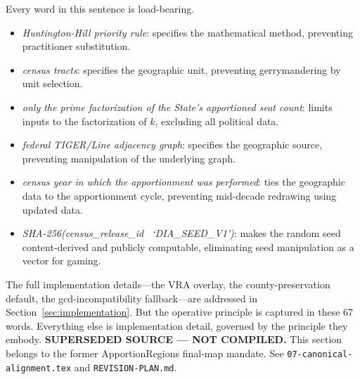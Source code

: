 Every word in this sentence is load-bearing.

\begin{itemize}
  \item \textit{Huntington-Hill priority rule}: specifies the mathematical
    method, preventing practitioner substitution.
  \item \textit{census tracts}: specifies the geographic unit, preventing
    gerrymandering by unit selection.
  \item \textit{only the prime factorization of the State's apportioned
    seat count}: limits inputs to the factorization of $k$, excluding
    all political data.
  \item \textit{federal TIGER/Line adjacency graph}: specifies the
    geographic source, preventing manipulation of the underlying graph.
  \item \textit{census year in which the apportionment was performed}:
    ties the geographic data to the apportionment cycle, preventing
    mid-decade redrawing using updated data.
  \item \textit{SHA-256(census\_release\_id \textbar\textbar\
    `DIA\_SEED\_V1')}: makes the random seed content-derived and publicly
    computable, eliminating seed manipulation as a vector for gaming.
\end{itemize}

The full implementation details---the VRA overlay, the county-preservation
default, the gcd-incompatibility fallback---are addressed in
Section~\ref{sec:implementation}.
But the operative principle is captured in these 67 words.
Everything else is implementation detail, governed by the principle they embody.
\noindent\textbf{SUPERSEDED SOURCE --- NOT COMPILED.} This section belongs to
the former ApportionRegions final-map mandate. See
\texttt{07-canonical-alignment.tex} and \texttt{REVISION-PLAN.md}.

